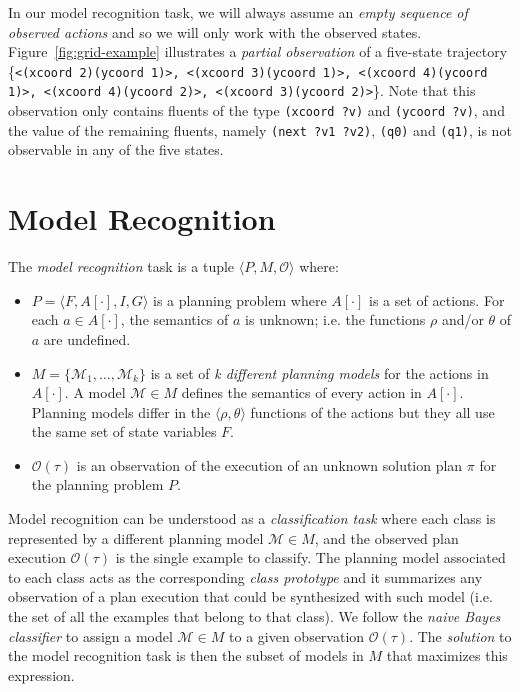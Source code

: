 \documentclass[letterpaper]{article} %
\newcommand{\tup}[1]{{\langle #1 \rangle}}
\begin{document}
In our model recognition task, we will always assume an \emph{empty sequence of observed actions} and so we will only work with the observed states. Figure~\ref{fig:grid-example} illustrates a {\em partial observation} of a five-state trajectory \{{\tt\scriptsize<(xcoord 2)(ycoord 1)>, <(xcoord 3)(ycoord 1)>, <(xcoord 4)(ycoord 1)>, <(xcoord 4)(ycoord 2)>, <(xcoord 3)(ycoord 2)>}\}. Note that this observation only contains fluents of the type {\tt\small (xcoord ?v)} and {\tt\small (ycoord ?v)}, and the value of the remaining fluents, namely {\tt\small (next ?v1 ?v2)}, {\tt\small (q0)} and {\tt\small (q1)}, is not observable in any of the five states.


\section{Model Recognition}
\label{sec:recognition}
The {\em model recognition} task is a tuple $\tup{P,M,\mathcal{O}}$ where:
\begin{itemize}
\item $P=\tup{F,A[\cdot],I,G}$ is a planning problem where $A[\cdot]$ is a set of actions. For each $a\in A[\cdot]$, the semantics of $a$ is unknown; i.e. the functions $\rho$ and/or $\theta$ of $a$ are undefined.
\item $M=\{\mathcal{M}_1,\ldots,\mathcal{M}_k\}$ is a set of {\em k different planning models} for the actions in $A[\cdot]$. A model $\mathcal{M}\in M$ defines the semantics of every action in $A[\cdot]$. Planning models differ in the $\tup{\rho,\theta}$ functions of the actions but they all use the same set of state variables $F$.
\item $\mathcal{O}(\tau)$ is an observation of the execution of an unknown solution plan $\pi$ for the planning problem $P$.
\end{itemize}

Model recognition can be understood as a {\em classification task} where each class is represented by a different planning model $\mathcal{M}\in M$, and the observed plan execution $\mathcal{O}(\tau)$ is the single example to classify. The planning model associated to each class acts as the corresponding {\em class prototype} and it summarizes any observation of a plan execution that could be synthesized with such model (i.e. the set of all the examples that belong to that class). We follow the {\em naive Bayes classifier} to assign a model $\mathcal{M}\in M$ to a given observation $\mathcal{O}(\tau)$. The {\em solution} to the model recognition task is then the subset of models in $M$ that maximizes this expression.
\end{document}
